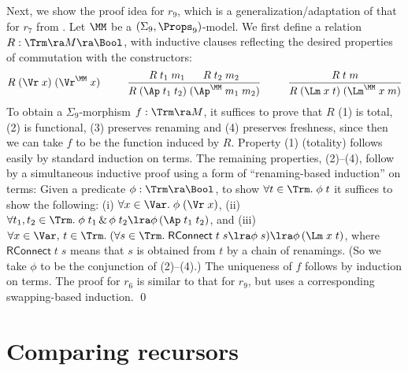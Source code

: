 Next, we show the proof idea for %
$r_9$, which is a generalization/adaptation of that for $r_7$ from  \citet{DBLP:conf/cade/Popescu22}. 
%
Let $\MM$ be a $(\Sigma_9,\Props_9)$-model. 
We first define 
a relation $R : \Trm \ra M \ra \Bool$, with inductive clauses reflecting the desired properties %
of commutation with the constructors:
$$R\;(\Vr\;x)\;(\Vr^\MM\;x)
\hspace*{6ex}
\frac{R\;t_1\;m_1 \hspace*{4ex} R\;t_2\;m_2}{R\;(\Ap\;t_1\;t_2)\;(\Ap^\MM\;m_1\;m_2)}
\hspace*{6ex}
\frac{R\;t\;m}{R\;(\Lm\;x\;t)\;(\Lm^\MM\;x\;m)}$$
%
To obtain a $\Sigma_9$-morphism $f : \Trm \ra M$, it suffices 
to prove that $R$ (1) is total, (2) is functional, (3) preserves renaming and (4) preserves freshness, since then we can take $f$ to be the function induced by $R$. 
%
Property (1) (totality) follows easily by standard induction on terms. 
The remaining properties, (2)--(4), follow by a  simultaneous inductive proof 
using a form of ``renaming-based induction'' on terms: Given a predicate $\phi : \Trm \ra \Bool$, to show $\forall t\in \Trm.\;\phi\;t$ it suffices to show the following: (i) $\forall x\in\Var.\;\phi\;(\Vr\;x)$, (ii) $\forall t_1,t_2\in\Trm.\;\phi\;t_1 \,\&\, \phi\;t_2 \lra \phi\,(\Ap\;t_1\;t_2)$, and (iii) $\forall x\in\Var,\,t\in\Trm.\;(\forall s\in\Trm.\; \textsf{RConnect}\;t\;s \lra \phi\;s) \lra \phi\,(\Lm\;x\;t)$, where $\textsf{RConnect}\;t\;s$ means that $s$ is obtained from $t$ by a chain of renamings. (So we take $\phi$ to be the conjunction of (2)--(4).) The uniqueness of $f$ follows by induction on terms. 
%
%
%
The proof for $r_6$ is similar to that for $r_9$, but uses a corresponding swapping-based induction.   
%
\qed 





\section{Comparing recursors} 
\label{sec-compareNominalRec}



